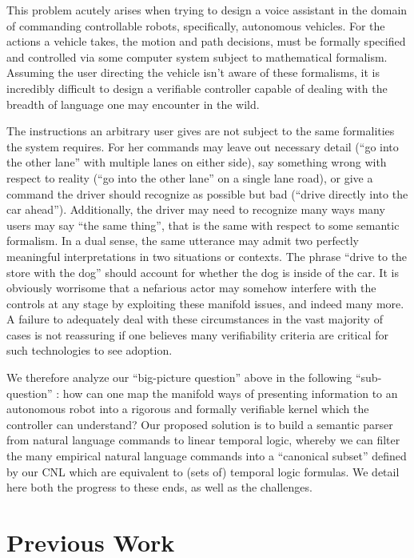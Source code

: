 \documentclass[a4paper, 11pt]{article}
\begin{document}
This problem acutely arises when trying to design a voice assistant in the
domain of commanding controllable robots, specifically, autonomous vehicles. For
the actions a vehicle takes, the motion and path decisions, must be formally
specified and controlled via some computer system subject to mathematical
formalism. Assuming the user directing the vehicle isn't aware of these
formalisms, it is incredibly difficult to design a verifiable controller capable
of dealing with the breadth of language one may encounter in the wild.

The instructions an arbitrary user gives are not subject to the same formalities
the system requires. For her commands may leave out necessary detail (``go into
the other lane'' with multiple lanes on either side), say something wrong with
respect to reality (``go into the other lane'' on a single lane road), or give a
command the driver should recognize as possible but bad (``drive directly
into the car ahead''). Additionally, the driver may need to recognize many
ways many users may say ``the same thing'', that is the same with respect to
some semantic formalism. In a dual sense, the same utterance may admit two
perfectly meaningful interpretations in two situations or contexts. The phrase
``drive to the store with the dog'' should account for whether the dog is inside
of the car. It is obviously worrisome that a nefarious actor may somehow
interfere with the controls at any stage by exploiting these manifold issues,
and indeed many more. A failure to adequately deal with these circumstances in the
vast majority of cases is not reassuring if one believes many verifiability
criteria are critical for such technologies to see adoption.

We therefore analyze our ``big-picture question'' above in the following
``sub-question'' : how can one map the manifold ways of presenting information
to an autonomous robot into a rigorous and formally verifiable kernel which the
controller can understand? Our proposed solution is to build a semantic parser
from natural language commands to linear temporal logic, whereby we can filter
the many empirical natural language commands into a ``canonical subset'' defined
by our CNL which are equivalent to (sets of) temporal logic formulas. We detail
here both the progress to these ends, as well as the challenges.

\section{Previous Work} 
\end{document}
